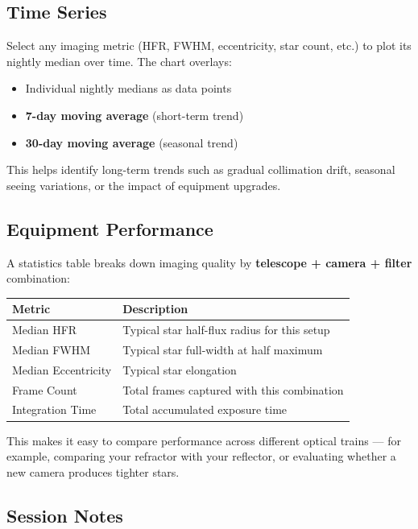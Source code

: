 \documentclass[11pt,a4paper]{article}
\begin{document}
\subsection{Time Series}

Select any imaging metric (HFR, FWHM, eccentricity, star count, etc.) to plot its nightly median over time. The chart overlays:

\begin{itemize}
    \item Individual nightly medians as data points
    \item \textbf{7-day moving average} (short-term trend)
    \item \textbf{30-day moving average} (seasonal trend)
\end{itemize}

This helps identify long-term trends such as gradual collimation drift, seasonal seeing variations, or the impact of equipment upgrades.

\subsection{Equipment Performance}

A statistics table breaks down imaging quality by \textbf{telescope + camera + filter} combination:

\begin{center}
\begin{tabular}{lp{8cm}}
\toprule
\textbf{Metric} & \textbf{Description} \\
\midrule
Median HFR & Typical star half-flux radius for this setup \\
Median FWHM & Typical star full-width at half maximum \\
Median Eccentricity & Typical star elongation \\
Frame Count & Total frames captured with this combination \\
Integration Time & Total accumulated exposure time \\
\bottomrule
\end{tabular}
\end{center}

This makes it easy to compare performance across different optical trains --- for example, comparing your refractor with your reflector, or evaluating whether a new camera produces tighter stars.

\subsection{Session Notes}
\end{document}
